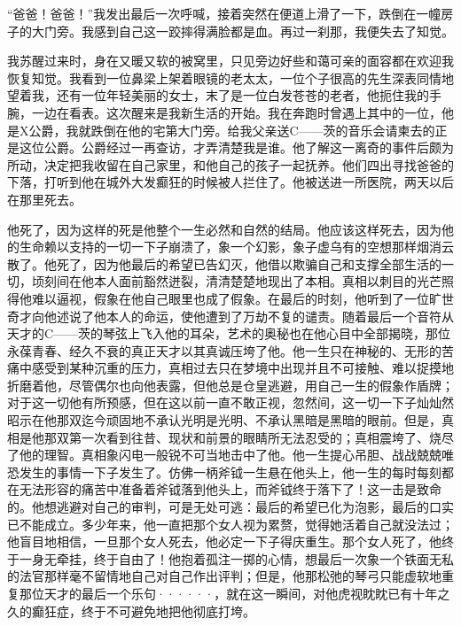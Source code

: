 \documentclass[12pt, UTF8]{ctexbook}
\begin{document}
\par “爸爸！爸爸！”我发出最后一次呼喊，接着突然在便道上滑了一下，跌倒在一幢房子的大门旁。我感到自己这一跤摔得满脸都是血。再过一刹那，我便失去了知觉。
\par 我苏醒过来时，身在又暖又软的被窝里，只见旁边好些和蔼可亲的面容都在欢迎我恢复知觉。我看到一位鼻梁上架着眼镜的老太太，一位个子很高的先生深表同情地望着我，还有一位年轻美丽的女士，末了是一位白发苍苍的老者，他扼住我的手腕，一边在看表。这次醒来是我新生活的开始。我在奔跑时曾遇上其中的一位，他是X公爵，我就跌倒在他的宅第大门旁。给我父亲送C——茨的音乐会请柬去的正是这位公爵。公爵经过一再查访，才弄清楚我是谁。他了解这一离奇的事件后颇为所动，决定把我收留在自己家里，和他自己的孩子一起抚养。他们四出寻找爸爸的下落，打听到他在城外大发癫狂的时候被人拦住了。他被送进一所医院，两天以后在那里死去。
\par 他死了，因为这样的死是他整个一生必然和自然的结局。他应该这样死去，因为他的生命赖以支持的一切一下子崩溃了，象一个幻影，象子虚乌有的空想那样烟消云散了。他死了，因为他最后的希望已告幻灭，他借以欺骗自己和支撑全部生活的一切，顷刻间在他本人面前豁然迸裂，清清楚楚地现出了本相。真相以刺目的光芒照得他难以逼视，假象在他自己眼里也成了假象。在最后的时刻，他听到了一位旷世奇才向他述说了他本人的命运，使他遭到了万劫不复的谴责。随着最后一个音符从天才的C——茨的琴弦上飞入他的耳朵，艺术的奥秘也在他心目中全部揭晓，那位永葆青春、经久不衰的真正天才以其真诚压垮了他。他一生只在神秘的、无形的苦痛中感受到某种沉重的压力，真相过去只在梦境中出现并且不可接触、难以捉摸地折磨着他，尽管偶尔也向他表露，但他总是仓皇逃避，用自己一生的假象作盾牌；对于这一切他有所预感，但在这以前一直不敢正视，忽然间，这一切一下子灿灿然昭示在他那双迄今顽固地不承认光明是光明、不承认黑暗是黑暗的眼前。但是，真相是他那双第一次看到往昔、现状和前景的眼睛所无法忍受的；真相震垮了、烧尽了他的理智。真相象闪电一般锐不可当地击中了他。他一生提心吊胆、战战兢兢唯恐发生的事情一下子发生了。仿佛一柄斧钺一生悬在他头上，他一生的每时每刻都在无法形容的痛苦中准备着斧钺落到他头上，而斧钺终于落下了！这一击是致命的。他想逃避对自己的审判，可是无处可逃：最后的希望已化为泡影，最后的口实已不能成立。多少年来，他一直把那个女人视为累赘，觉得她活着自己就没法过；他盲目地相信，一旦那个女人死去，他必定一下子得庆重生。那个女人死了，他终于一身无牵挂，终于自由了！他抱着孤注一掷的心情，想最后一次象一个铁面无私的法官那样毫不留情地自己对自己作出评判；但是，他那松弛的琴弓只能虚软地重复那位天才的最后一个乐句······，就在这一瞬间，对他虎视眈眈已有十年之久的癫狂症，终于不可避免地把他彻底打垮。
\newpage
\end{document}
